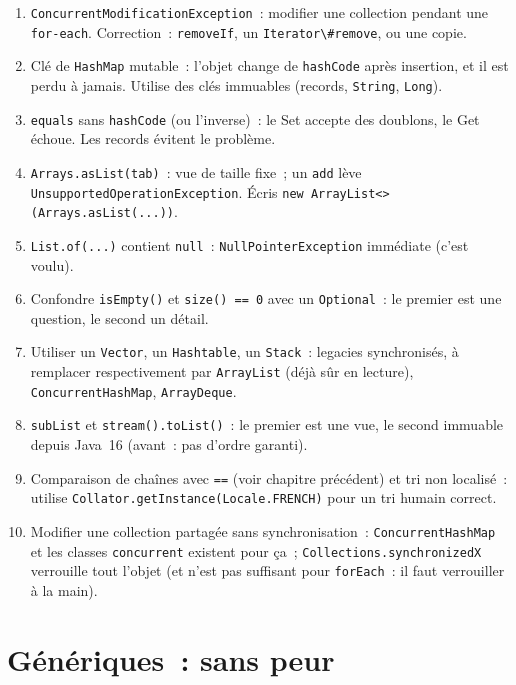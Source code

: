 \documentclass[12pt,a4paper,twoside,openright]{book}
\begin{document}
\begin{enumerate}
  \item \verb|ConcurrentModificationException|~: modifier une collection pendant une
        \verb|for-each|. Correction~: \verb|removeIf|, un \verb|Iterator\#remove|, ou une copie.
  \item Cl\'e de \verb|HashMap| mutable~: l'objet change de \verb|hashCode| apr\`es insertion, et il est
        perdu \`a jamais. Utilise des cl\'es immuables (records, \verb|String|, \verb|Long|).
  \item \verb|equals| sans \verb|hashCode| (ou l'inverse)~: le Set accepte des doublons, le Get
        \'echoue. Les records \'evitent le probl\`eme.
  \item \verb|Arrays.asList(tab)|~: vue de taille fixe~; un \verb|add| l\`eve
        \verb|UnsupportedOperationException|. \'Ecris \verb|new ArrayList<>(Arrays.asList(...))|.
  \item \verb|List.of(...)| contient \verb|null|~: \verb|NullPointerException| imm\'ediate (c'est voulu).
  \item Confondre \verb|isEmpty()| et \verb|size() == 0| avec un \verb|Optional|~: le premier est
        une question, le second un d\'etail.
  \item Utiliser un \verb|Vector|, un \verb|Hashtable|, un \verb|Stack|~: legacies synchronis\'es,
        \`a remplacer respectivement par \verb|ArrayList| (d\'ej\`a s\^ur en lecture), \verb|ConcurrentHashMap|,
        \verb|ArrayDeque|.
  \item \verb|subList| et \verb|stream().toList()|~: le premier est une vue, le second immuable
        depuis Java~16 (avant~: pas d'ordre garanti).
  \item Comparaison de cha\^ines avec \verb|==| (voir chapitre pr\'ec\'edent) et tri non localis\'e~:
        utilise \verb|Collator.getInstance(Locale.FRENCH)| pour un tri humain correct.
  \item Modifier une collection partag\'ee sans synchronisation~: \verb|ConcurrentHashMap| et les
        classes \verb|concurrent| existent pour \c{c}a~; \verb|Collections.synchronizedX| verrouille
        tout l'objet (et n'est pas suffisant pour \verb|forEach|~: il faut verrouiller \`a la main).
\end{enumerate}

\section{G\'en\'eriques~: sans peur}
\end{document}
